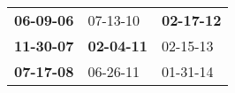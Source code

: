 \begin{supertabular}{p{0.33\columnwidth}p{0.33\columnwidth}p{0.33\columnwidth}}
 \textbf{06-09-06\textsuperscript{}} &           07-13-10\textsuperscript{} &  \textbf{02-17-12\textsuperscript{}} \\
 \textbf{11-30-07\textsuperscript{}} &  \textbf{02-04-11\textsuperscript{}} &           02-15-13\textsuperscript{} \\
 \textbf{07-17-08\textsuperscript{}} &           06-26-11\textsuperscript{} &           01-31-14\textsuperscript{} \\
\end{supertabular}

